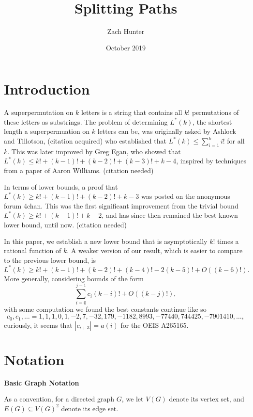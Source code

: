 \documentclass{article}
\title{Splitting Paths}
\author{Zach Hunter}
\date{October 2019}
\newcommand{\hide}[1]{}
\newcommand{\dc}[1]{}%
\begin{document}
\maketitle

\section{Introduction}

A superpermutation on $k$ letters is a string that contains all $k!$ permutations of these letters as substrings. The problem of determining $L^*(k)$, the shortest length a superpermuation on $k$ letters can be, was originally asked by  Ashlock and Tillotson, (citation acquired)\hide{(Daniel A. Ashlock and Jenett Tillotson. Construction of small superpermutations
and minimal injective superstrings. Congressus Numerantium,
93:91–98, 1993.)\dc{ use a ref command and bibliography package (see AMT papers, I don't remember all the syntax)}} who established that $L^*(k) \leq \sum_{i=1}^k i!$ for all $k$. This was later improved by Greg Egan, who showed that $L^*(k) \leq k!+(k-1)!+(k-2)!+(k-3)!+k-4$, inspired by techniques from a paper of Aaron Williams. (citation needed)

In terms of lower bounds, a proof that $L^*(k) \geq k! + (k-1)!+(k-2)! +k-3$ was posted on the anonymous forum 4chan. This was the first significant improvement from the trivial bound $L^*(k) \geq k! +(k-1)!+k-2$, and has since then remained the best known lower bound, until now. (citation needed)

In this paper, we establish a new lower bound that is asymptotically $k!$ times a rational function of $k$. A weaker version of our result, which is easier to compare to the previous lower bound, is
\[L^*(k) \geq k!+(k-1)!+(k-2)!+(k-4)!-2(k-5)! +O((k-6)!).\]
More generally, considering bounds of the form
\[\sum_{i=0}^{j-1} c_i(k-i)! + O((k-j)!),\]
 with some computation we found the best constants continue like so 
\[c_0,c_1,\dots = 1,1,1,0,1,-2,7,-32,179,-1182,8993,-77440,744425,-7901410,\dots,\]
curiously, it seems that $|c_{i+3}| = a(i)$ for the OEIS A265165.

\section{Notation}

\textbf{Basic Graph Notation}

As a convention, for a directed graph $G$, we let $V(G)$ denote its vertex set, and $E(G) \subseteq V(G)^2$ denote its edge set.
\end{document}
